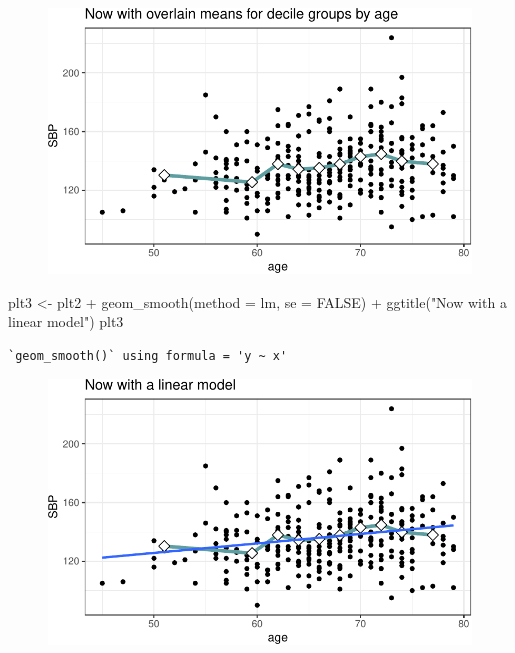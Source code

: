 \documentclass[
  letterpaper,
  DIV=11,
  numbers=noendperiod]{scrreport}
\newenvironment{Shaded}{\begin{snugshade}}{\end{snugshade}}
\newcommand{\AttributeTok}[1]{\textcolor[rgb]{0.40,0.45,0.13}{#1}}
\newcommand{\ConstantTok}[1]{\textcolor[rgb]{0.56,0.35,0.01}{#1}}
\newcommand{\FunctionTok}[1]{\textcolor[rgb]{0.28,0.35,0.67}{#1}}
\newcommand{\NormalTok}[1]{\textcolor[rgb]{0.00,0.23,0.31}{#1}}
\newcommand{\OtherTok}[1]{\textcolor[rgb]{0.00,0.23,0.31}{#1}}
\newcommand{\SpecialCharTok}[1]{\textcolor[rgb]{0.37,0.37,0.37}{#1}}
\newcommand{\StringTok}[1]{\textcolor[rgb]{0.13,0.47,0.30}{#1}}
\begin{document}
\begin{figure}[H]

{\centering \includegraphics{week1/week1_files/figure-pdf/unnamed-chunk-4-2.pdf}

}

\end{figure}

\begin{Shaded}
\begin{Highlighting}[]
\NormalTok{plt3 }\OtherTok{\textless{}{-}} 
\NormalTok{  plt2 }\SpecialCharTok{+} 
  \FunctionTok{geom\_smooth}\NormalTok{(}\AttributeTok{method =} \StringTok{\textquotesingle{}lm\textquotesingle{}}\NormalTok{, }\AttributeTok{se =} \ConstantTok{FALSE}\NormalTok{) }\SpecialCharTok{+} 
  \FunctionTok{ggtitle}\NormalTok{(}\StringTok{"Now with a linear model"}\NormalTok{) }
\NormalTok{plt3 }
\end{Highlighting}
\end{Shaded}

\begin{verbatim}
`geom_smooth()` using formula = 'y ~ x'
\end{verbatim}

\begin{figure}[H]

{\centering \includegraphics{week1/week1_files/figure-pdf/unnamed-chunk-4-3.pdf}

}

\end{figure}
\end{document}
